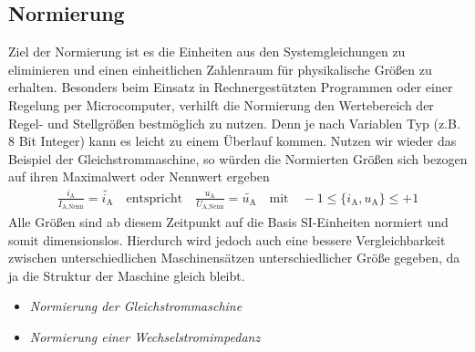 \subsection{Normierung}
%
Ziel der Normierung ist es die Einheiten aus den Systemgleichungen zu eliminieren und einen einheitlichen Zahlenraum für physikalische Größen zu erhalten. Besonders beim Einsatz in Rechnergestützten Programmen oder einer Regelung per Microcomputer, verhilft die Normierung den Wertebereich der Regel- und Stellgrößen bestmöglich zu nutzen. Denn je nach Variablen Typ (z.B. 8 Bit Integer) kann es leicht zu einem Überlauf kommen. Nutzen wir wieder das Beispiel der Gleichstrommaschine, so würden die Normierten Größen sich bezogen auf ihren Maximalwert oder Nennwert ergeben \cite{SML14}
%
\begin{equation*}
\begin{aligned}
%
\frac{i_\text{A}}{I_{\text{A,Nenn}}}=\tilde{i_\text{A}} \quad \text{entspricht} \quad \frac{u_\text{A}}{U_{\text{A,Nenn}}}=\tilde{u_\text{A}} \quad \text{mit} \quad -1\leq \{i_\text{A},u_\text{A}\} \leq +1
%
\end{aligned}
\end{equation*}
%
Alle Größen sind ab diesem Zeitpunkt auf die Basis SI-Einheiten normiert und somit dimensionslos. Hierdurch wird jedoch auch eine bessere Vergleichbarkeit zwischen unterschiedlichen Maschinensätzen unterschiedlicher Größe gegeben, da ja die Struktur der Maschine gleich bleibt.
%
\begin{Aufgaben}{}{}
	\begin{itemize}
		\item \textit{Normierung der Gleichstrommaschine}
		\item \textit{Normierung einer Wechselstromimpedanz}
	\end{itemize}
\end{Aufgaben}
%
\newpage
%
